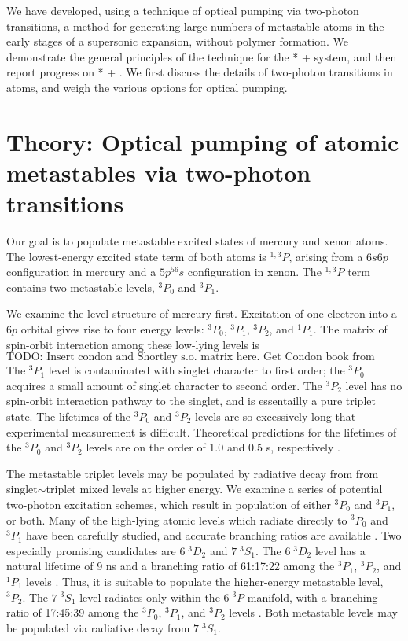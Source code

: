 \documentclass[12pt]{mitthesis}
\begin{document}
We have developed, using a technique of optical pumping via two-photon
transitions, a method for generating large numbers of metastable atoms
in the early stages of a supersonic expansion, without polymer
formation.  We demonstrate the general principles of the technique for
the * +  system, and then report progress on
* + .  We first discuss the details of two-photon
transitions in atoms, and weigh the various options for optical
pumping.

\section{Theory: Optical pumping of atomic metastables via two-photon
  transitions}

Our goal is to populate metastable excited states of mercury and xenon
atoms.  The lowest-energy excited state term of both atoms is
$^{1,3}P$, arising from a $6s6p$ configuration in mercury and a
$5p^56s$ configuration in xenon.  The $^{1,3}P$ term contains two
metastable levels, $^3P_0$ and $ ^3P_1$.

We examine the level structure of mercury first.  Excitation of one
electron into a $6p$ orbital gives rise to four energy levels: $^3P_0$,
$^3P_1$, $^3P_2$, and $^1P_1$.  The matrix of spin-orbit interaction
among these low-lying levels is
\begin{equation}
  \text{TODO: Insert condon and Shortley s.o. matrix here. Get Condon
    book from MIT.}
\end{equation}
The $^3P_1$ level is contaminated with singlet character to first
order; the $^3P_0$ acquires a small amount of singlet character to
second order.  The $^3P_2$ level has no spin-orbit interaction pathway
to the singlet, and is essentailly a pure triplet state.  The
lifetimes of the $^3P_0$ and $^3P_2$ levels are so excessively long
that experimental measurement is difficult.  Theoretical predictions
for the lifetimes of the $^3P_0$ and $^3P_2$ levels are on the order
of 1.0 and 0.5 s, respectively \cite{mishra01}.

The metastable triplet levels may be populated by radiative decay from
from singlet$\sim$triplet mixed levels at higher energy.  We examine a
series of potential two-photon excitation schemes, which result in
population of either $^3P_0$ and $^3P_1$, or both.  Many of the
high-lying atomic levels which radiate directly to $^3P_0$ and $^3P_1$
have been carefully studied, and accurate branching ratios are
available \cite{benck89}.    Two
especially promising candidates are $6 \; ^3D_2$ and $7 \; ^3S_1$.
The $6 \; ^3D_2$ level has a natural lifetime of 9 ns and a branching
ratio of 61:17:22 among the $^3P_1$, $^3P_2$, and $^1P_1$ levels
\cite{benck89}.  Thus, it is suitable to populate the higher-energy
metastable level, $^3P_2$.  The $7 \; ^3S_1$ level radiates only
within the $6 \; ^3P$ manifold, with a branching ratio of 17:45:39
among the $^3P_0$, $^3P_1$, and $^3P_2$ levels \cite{benck89}.  Both
metastable levels may be populated via radiative decay from $7 \;
^3S_1$.
\end{document}
